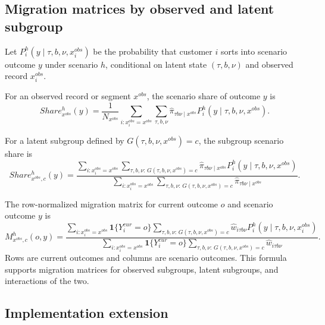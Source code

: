 \documentclass[11pt]{article}
\newcommand{\one}{\mathbf{1}}
\begin{document}
\subsection{Migration matrices by observed and latent subgroup}

Let $P_i^h(y\mid \tau,b,\nu,x_i^{obs})$ be the probability that customer $i$ sorts into scenario outcome $y$ under scenario $h$, conditional on latent state $(\tau,b,\nu)$ and observed record $x_i^{obs}$.

For an observed record or segment $x^{obs}$, the scenario share of outcome $y$ is
\[
Share_{x^{obs}}^h(y)
=
\frac{1}{N_{x^{obs}}}
\sum_{i:x_i^{obs}=x^{obs}}
\sum_{\tau,b,\nu}
\widehat\pi_{\tau b\nu\mid x^{obs}}
P_i^h(y\mid \tau,b,\nu,x^{obs}).
\]

For a latent subgroup defined by $G(\tau,b,\nu,x^{obs})=c$, the subgroup scenario share is
\[
Share_{x^{obs},c}^h(y)
=
\frac{
\sum_{i:x_i^{obs}=x^{obs}}
\sum_{\tau,b,\nu:\,G(\tau,b,\nu,x^{obs})=c}
\widehat\pi_{\tau b\nu\mid x^{obs}}
P_i^h(y\mid \tau,b,\nu,x^{obs})
}{
\sum_{i:x_i^{obs}=x^{obs}}
\sum_{\tau,b,\nu:\,G(\tau,b,\nu,x^{obs})=c}
\widehat\pi_{\tau b\nu\mid x^{obs}}
}.
\]

The row-normalized migration matrix for current outcome $o$ and scenario outcome $y$ is
\[
M_{x^{obs},c}^h(o,y)
=
\frac{
\sum_{i:x_i^{obs}=x^{obs}}
\one\{Y_i^{cur}=o\}
\sum_{\tau,b,\nu:\,G(\tau,b,\nu,x^{obs})=c}
\widehat w_{i\tau b\nu}
P_i^h(y\mid \tau,b,\nu,x_i^{obs})
}{
\sum_{i:x_i^{obs}=x^{obs}}
\one\{Y_i^{cur}=o\}
\sum_{\tau,b,\nu:\,G(\tau,b,\nu,x^{obs})=c}
\widehat w_{i\tau b\nu}
}.
\]
Rows are current outcomes and columns are scenario outcomes. This formula supports migration matrices for observed subgroups, latent subgroups, and interactions of the two.

\newpage
\subsection{Implementation extension}
\end{document}
